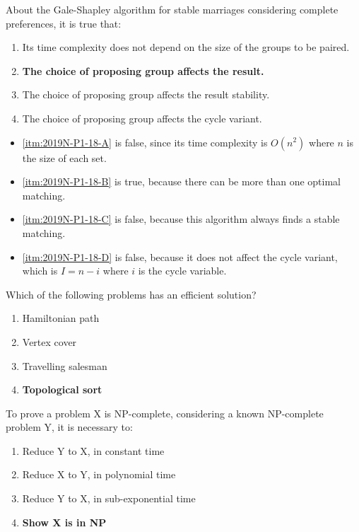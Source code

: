 \documentclass{cal}
\begin{document}
{
About the Gale-Shapley algorithm for stable marriages considering complete preferences, it is true that:
\begin{enumerate}[label=\Alph*)]\itemsep0em
    \item \label{itm:2019N-P1-18-A} Its time complexity does not depend on the size of the groups to be paired.
    \item \label{itm:2019N-P1-18-B} \textbf{The choice of proposing group affects the result. \greencheckmark}
    \item \label{itm:2019N-P1-18-C} The choice of proposing group affects the result stability.
    \item \label{itm:2019N-P1-18-D} The choice of proposing group affects the cycle variant.
\end{enumerate}

\ansseparator

\begin{itemize}
    \item[] \ref{itm:2019N-P1-18-A} is false, since its time complexity is $O(n^2)$ where $n$ is the size of each set.
    \item[] \ref{itm:2019N-P1-18-B} is true, because there can be more than one optimal matching.
    \item[] \ref{itm:2019N-P1-18-C} is false, because this algorithm always finds a stable matching.
    \item[] \ref{itm:2019N-P1-18-D} is false, because it does not affect the cycle variant, which is $I = n-i$ where $i$ is the cycle variable.  
\end{itemize}

Which of the following problems has an efficient solution?
\begin{enumerate}[label=\Alph*)]\itemsep0em
    \item Hamiltonian path
    \item Vertex cover
    \item Travelling salesman
    \item \textbf{Topological sort \greencheckmark}
\end{enumerate}

To prove a problem X is NP-complete, considering a known NP-complete problem Y, it is necessary to:
\begin{enumerate}[label=\Alph*)]\itemsep0em
    \item Reduce Y to X, in constant time
    \item Reduce X to Y, in polynomial time
    \item Reduce Y to X, in sub-exponential time
    \item \textbf{Show X is in NP \greencheckmark}
\end{enumerate}

}
\end{document}
